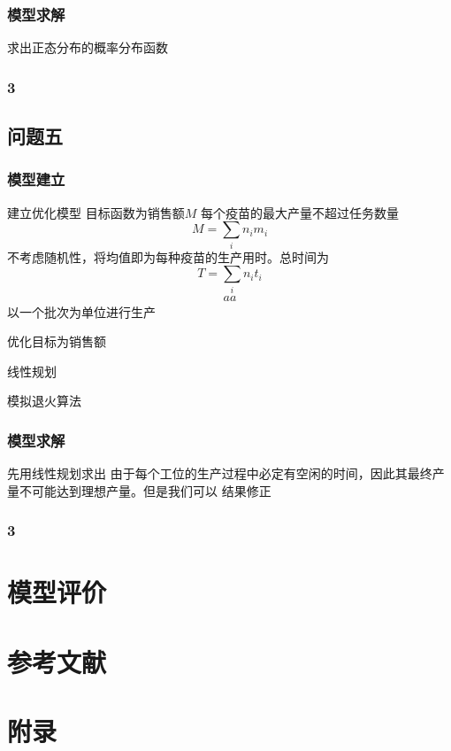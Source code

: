 \documentclass[UTF8]{ctexart}
\begin{document}
	\subsubsection{模型求解}
	求出正态分布的概率分布函数
	\subsubsection{3}
	
	\subsection{问题五}
	\subsubsection{模型建立}
	建立优化模型
	目标函数为销售额$M$
	每个疫苗的最大产量不超过任务数量
	\begin{equation}
		M=\sum_{i}n_{i}m_{i}
	\end{equation}
	不考虑随机性，将均值即为每种疫苗的生产用时。总时间为
	\begin{equation}
		T=\sum_{i}n_{i}t_{i}
	\end{equation}
	\begin{equation}
	\begin{split}
		aa
	\end{split}
	\end{equation}
	以一个批次为单位进行生产
	\par 优化目标为销售额
	\par 线性规划
	\par 模拟退火算法
	\subsubsection{模型求解}
	先用线性规划求出
	由于每个工位的生产过程中必定有空闲的时间，因此其最终产量不可能达到理想产量。但是我们可以
	结果修正
	\subsubsection{3}
	
	\section{模型评价}
	
	
	\section{参考文献}
	
	\section{附录}
	\begin{appendices}
		
	\end{appendices}
	
\end{document}

